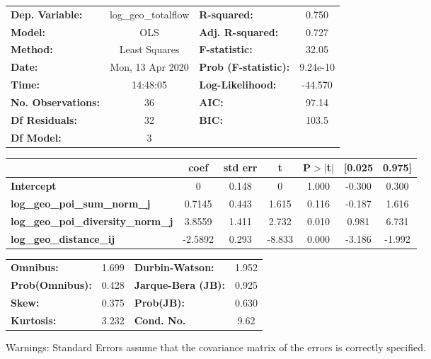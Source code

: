\begin{center}
\begin{tabular}{lclc}
\toprule
\textbf{Dep. Variable:}                    & log\_geo\_totalflow & \textbf{  R-squared:         } &     0.750   \\
\textbf{Model:}                            &         OLS         & \textbf{  Adj. R-squared:    } &     0.727   \\
\textbf{Method:}                           &    Least Squares    & \textbf{  F-statistic:       } &     32.05   \\
\textbf{Date:}                             &   Mon, 13 Apr 2020  & \textbf{  Prob (F-statistic):} &  9.24e-10   \\
\textbf{Time:}                             &       14:48:05      & \textbf{  Log-Likelihood:    } &   -44.570   \\
\textbf{No. Observations:}                 &            36       & \textbf{  AIC:               } &     97.14   \\
\textbf{Df Residuals:}                     &            32       & \textbf{  BIC:               } &     103.5   \\
\textbf{Df Model:}                         &             3       & \textbf{                     } &             \\
\bottomrule
\end{tabular}
\begin{tabular}{lcccccc}
                                           & \textbf{coef} & \textbf{std err} & \textbf{t} & \textbf{P$> |$t$|$} & \textbf{[0.025} & \textbf{0.975]}  \\
\midrule
\textbf{Intercept}                         &            0  &        0.148     &         0  &         1.000        &       -0.300    &        0.300     \\
\textbf{log\_geo\_poi\_sum\_norm\_j}       &       0.7145  &        0.443     &     1.615  &         0.116        &       -0.187    &        1.616     \\
\textbf{log\_geo\_poi\_diversity\_norm\_j} &       3.8559  &        1.411     &     2.732  &         0.010        &        0.981    &        6.731     \\
\textbf{log\_geo\_distance\_ij}            &      -2.5892  &        0.293     &    -8.833  &         0.000        &       -3.186    &       -1.992     \\
\bottomrule
\end{tabular}
\begin{tabular}{lclc}
\textbf{Omnibus:}       &  1.699 & \textbf{  Durbin-Watson:     } &    1.952  \\
\textbf{Prob(Omnibus):} &  0.428 & \textbf{  Jarque-Bera (JB):  } &    0.925  \\
\textbf{Skew:}          &  0.375 & \textbf{  Prob(JB):          } &    0.630  \\
\textbf{Kurtosis:}      &  3.232 & \textbf{  Cond. No.          } &     9.62  \\
\bottomrule
\end{tabular}
\end{center}

Warnings: \newline
 [1] Standard Errors assume that the covariance matrix of the errors is correctly specified.